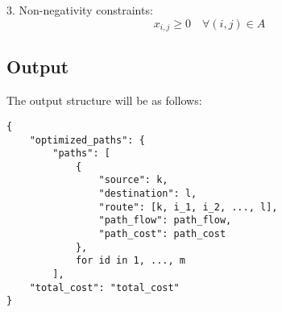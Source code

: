 \documentclass{article}
\begin{document}
3. Non-negativity constraints:
\[
x_{i,j} \geq 0 \quad \forall (i,j) \in A
\]

\subsection*{Output}
The output structure will be as follows:
\begin{verbatim}
{
    "optimized_paths": {
        "paths": [
            {
                "source": k,
                "destination": l,
                "route": [k, i_1, i_2, ..., l],
                "path_flow": path_flow,
                "path_cost": path_cost
            },
            for id in 1, ..., m 
        ],
    "total_cost": "total_cost"
}
\end{verbatim}
\end{document}
